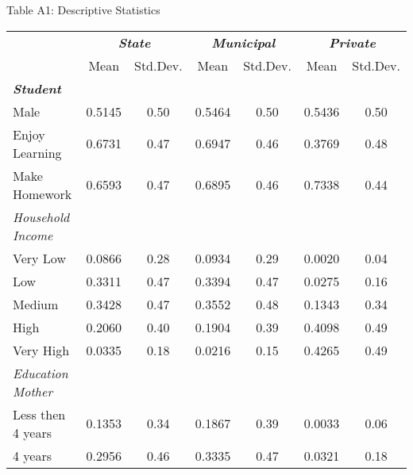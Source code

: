 \documentclass{beamer}
\begin{document}
\begin{frame}{Table A1: Descriptive Statistics}
\begin{adjustbox}{max width=\textwidth} 
\begin{tabular}{l*{3}{cc}}
\toprule
                    &\multicolumn{2}{c}{\textbf{\emph{State}}}&\multicolumn{2}{c}{\textbf{\emph{Municipal}}}&\multicolumn{2}{c}{\textbf{\emph{Private}}}\\
                    &\multicolumn{1}{c}{{Mean}}&\multicolumn{1}{l}{{Std.Dev.}}&\multicolumn{1}{c}{{Mean}}&\multicolumn{1}{l}{{Std.Dev.}}&\multicolumn{1}{c}{{Mean}}&\multicolumn{1}{l}{{Std.Dev.}} \vspace{-3pt}\\
\midrule
\textbf{\emph{Student}}&            &            &            &            &            &           \vspace{-3pt} \\
Male                &      0.5145&        0.50&      0.5464&        0.50&      0.5436&        0.50\\
Enjoy Learning      &      0.6731&        0.47&      0.6947&        0.46&      0.3769&        0.48\\
Make Homework       &      0.6593&        0.47&      0.6895&        0.46&      0.7338&        0.44\\
\emph{Household Income}&            &            &            &            &            &            \\
Very Low            &      0.0866&        0.28&      0.0934&        0.29&      0.0020&        0.04\\
Low                 &      0.3311&        0.47&      0.3394&        0.47&      0.0275&        0.16\\
Medium              &      0.3428&        0.47&      0.3552&        0.48&      0.1343&        0.34\\
High                &      0.2060&        0.40&      0.1904&        0.39&      0.4098&        0.49\\
Very High           &      0.0335&        0.18&      0.0216&        0.15&      0.4265&        0.49\\
\emph{Education Mother}&            &            &            &            &            &            \\
Less then 4 years   &      0.1353&        0.34&      0.1867&        0.39&      0.0033&        0.06\\
4 years             &      0.2956&        0.46&      0.3335&        0.47&      0.0321&        0.18\\

\end{tabular}
\end{adjustbox}
\end{frame}
\end{document}
